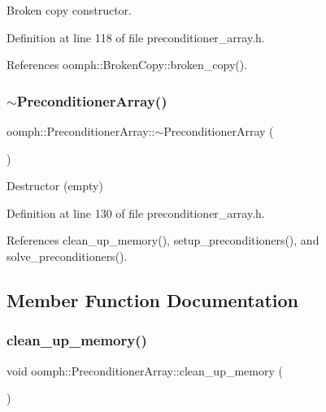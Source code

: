 Broken copy constructor. 



Definition at line 118 of file preconditioner\+\_\+array.\+h.



References oomph\+::\+Broken\+Copy\+::broken\+\_\+copy().

\mbox{\label{classoomph_1_1PreconditionerArray_abb6326ed44c67eff34760bd5944d0cf3}} 
\subsubsection{\texorpdfstring{$\sim$\+Preconditioner\+Array()}{~PreconditionerArray()}}
{\footnotesize\ttfamily oomph\+::\+Preconditioner\+Array\+::$\sim$\+Preconditioner\+Array (\begin{DoxyParamCaption}{ }\end{DoxyParamCaption})\hspace{0.3cm}{\ttfamily [inline]}}



Destructor (empty) 



Definition at line 130 of file preconditioner\+\_\+array.\+h.



References clean\+\_\+up\+\_\+memory(), setup\+\_\+preconditioners(), and solve\+\_\+preconditioners().



\subsection{Member Function Documentation}
\mbox{\label{classoomph_1_1PreconditionerArray_aa215f08a32f670700a08035bcc75dc63}} 
\subsubsection{\texorpdfstring{clean\+\_\+up\+\_\+memory()}{clean\_up\_memory()}}
{\footnotesize\ttfamily void oomph\+::\+Preconditioner\+Array\+::clean\+\_\+up\+\_\+memory (\begin{DoxyParamCaption}{ }\end{DoxyParamCaption})\hspace{0.3cm}{\ttfamily [inline]}}



